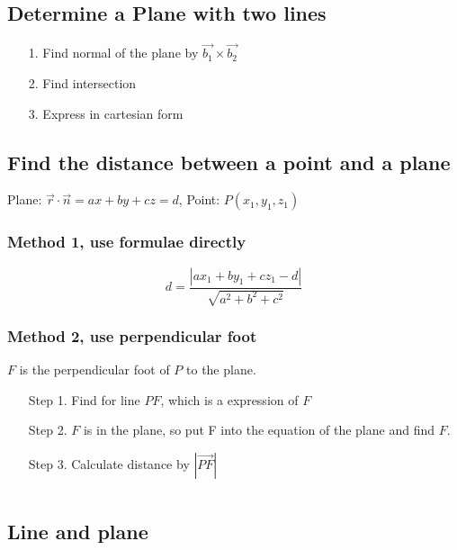 \documentclass[a4paper,9pt]{scrartcl}
\newcommand{\vecabs}[1]{\left| \vec{#1} \right|}
\newcommand{\abs}[1]{\left| #1 \right|}
\begin{document}
    \subsection{Determine a Plane with two lines}
    \begin{itemize}
        \item [1.] Find normal of the plane by $\vec{b_1}\times\vec{b_2}$
        \item [2.] Find intersection
        \item [3.] Express in cartesian form
    \end{itemize}

    \subsection{Find the distance between a point and a plane}
    Plane: $\vec{r}\cdot\vec{n} = ax +by+cz=d$,
    Point: $P(x_1,y_1,z_1)$

    \subsubsection{Method 1, use formulae directly}
    \begin{displaymath}
        d = \frac{\abs{ax_1+by_1+cz_1-d}}{\sqrt{a^2+b^2+c^2}}
    \end{displaymath}

    \subsubsection{Method 2, use perpendicular foot}

    $F$ is the perpendicular foot of $P$ to the plane.

    \begin{itemize}
        \item [Step 1.] Find  for line $PF$, which is a expression of $F$
        \item [Step 2.] $F$ is in the plane, so put F into the equation of the plane and find $F$.
        \item [Step 3.] Calculate distance by $\vecabs{PF}$
    \end{itemize}

    \begin{displaymath}

    \end{displaymath}

    \subsection{Line and plane}
\end{document}
